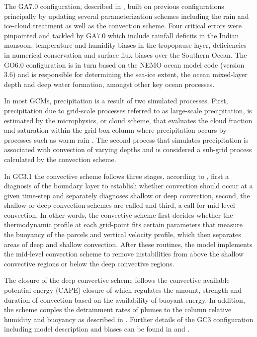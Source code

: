 The GA7.0 configuration, described in \cite{walters2019}, built on previous configurations principally by updating several parameterization schemes including the rain and ice-cloud treatment as well as the convection scheme. Four critical errors were pinpointed and tackled by GA7.0 which include rainfall deficits in the Indian monsoon, temperature and humidity biases in the tropopause layer, deficiencies in numerical conservation and surface flux biases over the Southern Ocean. The GO6.0 configuration \citep{storkey2018} is in turn based on the NEMO ocean model code (version 3.6) and is responsible for determining the sea-ice extent, the ocean mixed-layer depth and deep water formation, amongst other key ocean processes.


In most GCMs, precipitation is a result of two simulated processes. First, precipitation due to grid-scale processes referred to as large-scale precipitation, is estimated by the microphysics, or cloud scheme, that evaluates the cloud fraction and saturation within the grid-box column where precipitation occurs by processes such as warm rain \citep{walters2019}. 
The second process that simulates precipitation is associated with convection of varying depths and is considered a sub-grid process calculated by the convection scheme. 

In GC3.1 the convective scheme follows three stages, according to \cite{walters2019}, first a diagnosis of the boundary layer to establish whether convection should occur at a given time-step and separately diagnoses shallow or deep convection, second, the shallow or deep convection schemes are called and third, a call for mid-level convection. 
In other words, the convective scheme first decides whether the thermodynamic profile at each grid-point fits certain parameters that measure the buoyancy of the parcels and vertical velocity profile, which then separates areas of deep and shallow convection. After these routines, the model implements the mid-level convection scheme to remove instabilities from above the shallow convective regions or below the deep convective regions. 

The closure of the deep convective scheme follows the convective available potential energy (CAPE) closure of \cite{fritsch} which regulates the amount, strength and duration of convection based on the availability of buoyant energy. In addition, the scheme couples the detrainment rates of plumes to the column relative humidity and buoyancy as described in \cite{derbyshire2011}.
Further details of the GC3 configuration including model description and biases can be found in \cite{williams2018} and \cite{kuhlbrodt2018}.


